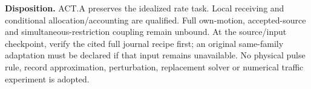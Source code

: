\documentclass[11pt,a4paper]{article}
\begin{document}
\textbf{Disposition.} ACT.A preserves the idealized rate task. Local receiving
and conditional allocation/accounting are qualified. Full own-motion,
accepted-source and simultaneous-restriction coupling remain unbound.
At the source/input checkpoint, verify the cited full journal recipe first;
an original same-family adaptation must be declared if that input remains
unavailable. No physical pulse rule, record approximation, perturbation,
replacement solver or numerical traffic experiment is adopted.
\end{document}

